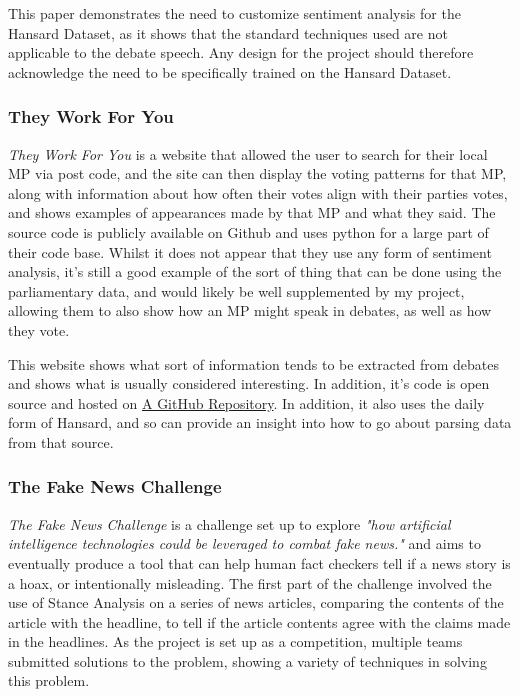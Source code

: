 This paper demonstrates the need to customize sentiment analysis for the Hansard Dataset, as it shows that the standard techniques used are not applicable to the debate speech. Any design for the project should therefore acknowledge the need to be specifically trained on the Hansard Dataset.

\subsubsection{They Work For You}
\emph{They Work For You}\cite{mySociety} is a website that allowed the user to search for their local MP via post code, and the site can then display the voting patterns for that MP, along with information about how often their votes align with their parties votes, and shows examples of appearances made by that MP and what they said. The source code is publicly available on Github and uses python for a large part of their code base. Whilst it does not appear that they use any form of sentiment analysis, it’s still a good example of the sort of thing that can be done using the parliamentary data, and would likely be well supplemented by my project, allowing them to also show how an MP might speak in debates, as well as how they vote.

This website shows what sort of information tends to be extracted from debates and shows what is usually considered interesting. In addition, it's code is open source and hosted on \href{https://github.com/mysociety/theyworkforyou}{A GitHub Repository}. In addition, it also uses the daily form of Hansard, and so can provide an insight into how to go about parsing data from that source.

\subsubsection{The Fake News Challenge}
\emph{The Fake News Challenge}\cite{FakeNewsChallenge2017} is a challenge set up to explore \emph{"how artificial intelligence technologies could be leveraged to combat fake news."} and aims to eventually produce a tool that can help human fact checkers tell if a news story is a hoax, or intentionally misleading. The first part of the challenge involved the use of Stance Analysis on a series of news articles, comparing the contents of the article with the headline, to tell if the article contents agree with the claims made in the headlines. As the project is set up as a competition, multiple teams submitted solutions to the problem, showing a variety of techniques in solving this problem.

